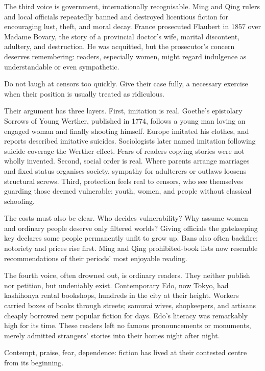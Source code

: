 The third voice is government, internationally recognisable. Ming and Qing rulers and local officials repeatedly banned and destroyed licentious fiction for encouraging lust, theft, and moral decay. France prosecuted Flaubert in 1857 over Madame Bovary, the story of a provincial doctor's wife, marital discontent, adultery, and destruction. He was acquitted, but the prosecutor's concern deserves remembering: readers, especially women, might regard indulgence as understandable or even sympathetic.

Do not laugh at censors too quickly. Give their case fully, a necessary exercise when their position is usually treated as ridiculous.

Their argument has three layers. First, imitation is real. Goethe's epistolary Sorrows of Young Werther, published in 1774, follows a young man loving an engaged woman and finally shooting himself. Europe imitated his clothes, and reports described imitative suicides. Sociologists later named imitation following suicide coverage the Werther effect. Fears of readers copying stories were not wholly invented. Second, social order is real. Where parents arrange marriages and fixed status organises society, sympathy for adulterers or outlaws loosens structural screws. Third, protection feels real to censors, who see themselves guarding those deemed vulnerable: youth, women, and people without classical schooling.

The costs must also be clear. Who decides vulnerability? Why assume women and ordinary people deserve only filtered worlds? Giving officials the gatekeeping key declares some people permanently unfit to grow up. Bans also often backfire: notoriety and prices rise first. Ming and Qing prohibited-book lists now resemble recommendations of their periods' most enjoyable reading.

The fourth voice, often drowned out, is ordinary readers. They neither publish nor petition, but undeniably exist. Contemporary Edo, now Tokyo, had kashihonya rental bookshops, hundreds in the city at their height. Workers carried boxes of books through streets; samurai wives, shopkeepers, and artisans cheaply borrowed new popular fiction for days. Edo's literacy was remarkably high for its time. These readers left no famous pronouncements or monuments, merely admitted strangers' stories into their homes night after night.

Contempt, praise, fear, dependence: fiction has lived at their contested centre from its beginning.

